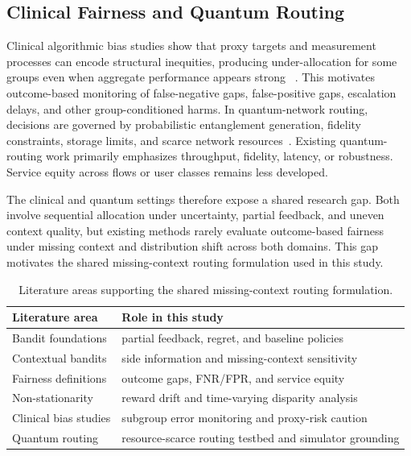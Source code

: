 \documentclass[conference]{IEEEtran}
\begin{document}
\subsection{Clinical Fairness and Quantum Routing}
Clinical algorithmic bias studies show that proxy targets and measurement
processes can encode structural inequities, producing under-allocation for
some groups even when aggregate performance appears strong
~\cite{obermeyer2019dissecting}. This motivates outcome-based monitoring of
false-negative gaps, false-positive gaps, escalation delays, and other
group-conditioned harms. In quantum-network routing, decisions are governed by
probabilistic entanglement generation, fidelity constraints, storage limits,
and scarce network resources~\cite{wehner2018quantum,pant2019routing,caleffi2017optimal}.
Existing quantum-routing work primarily emphasizes throughput, fidelity,
latency, or robustness. Service equity across flows or user classes remains
less developed.

The clinical and quantum settings therefore expose a shared research gap.
Both involve sequential allocation under uncertainty, partial feedback, and
uneven context quality, but existing methods rarely evaluate outcome-based
fairness under missing context and distribution shift across both domains.
This gap motivates the shared missing-context routing formulation used in this
study.

\begin{table}[t]
\caption{Literature areas supporting the shared missing-context routing formulation.}
\label{tab:related_map}
\centering
\small
\begin{tabular}{p{}p{}}
\toprule
\textbf{Literature area} & \textbf{Role in this study} \\
\midrule
Bandit foundations & partial feedback, regret, and baseline policies \\
Contextual bandits & side information and missing-context sensitivity \\
Fairness definitions & outcome gaps, FNR/FPR, and service equity \\
Non-stationarity & reward drift and time-varying disparity analysis \\
Clinical bias studies & subgroup error monitoring and proxy-risk caution \\
Quantum routing & resource-scarce routing testbed and simulator grounding \\
\bottomrule
\end{tabular}
\end{table}
\end{document}
